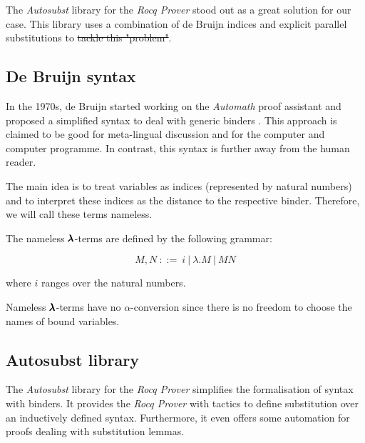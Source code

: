The \textit{Autosubst} library for the \textit{Rocq Prover} stood out as a great solution for our case. 
This library uses a combination of de Bruijn indices and explicit parallel substitutions to \sout{tackle this "problem"}.


\subsection{De Bruijn syntax}

\cite{deBruijn} \cite{AutosubstSchafer}

In the 1970s, de Bruijn started working on the \textit{Automath} proof assistant and proposed a simplified syntax to deal with generic binders \cite{deBruijn}.
This approach is claimed to be good for meta-lingual discussion and for the computer and computer programme. In contrast, this syntax is further away from the human reader.

The main idea is to treat variables as indices (represented by natural numbers) and to interpret these indices as the distance to the respective binder.
Therefore, we will call these terms nameless. 

\begin{definition}
  The nameless $\pmb{\lambda}$-terms are defined by the following grammar:

  \[ M, N \ ::= \ i \ | \ \lambda . M \ | \ M N \]

  where $i$ ranges over the natural numbers.
\end{definition}

\begin{remark}
  Nameless $\pmb{\lambda}$-terms have no $\alpha$-conversion since there is no freedom to choose the names of bound variables.
\end{remark}


\subsection{Autosubst library}
\cite{AutosubstSchafer}

The \textit{Autosubst} library for the \textit{Rocq Prover} simplifies the formalisation of syntax with binders.
It provides the \textit{Rocq Prover} with tactics to define substitution over an inductively defined syntax.
Furthermore, it even offers some automation for proofs dealing with substitution lemmas.

